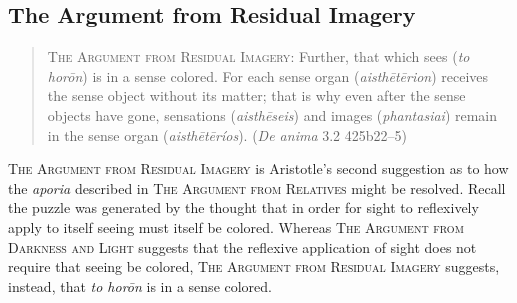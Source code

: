 





\subsection{The Argument from Residual Imagery} %
\label{sub:the_argument_from_residual_imagery}

\begin{quote}
	\textsc{The Argument from Residual Imagery}: Further, that which sees (\emph{to horōn}) is in a sense colored. For each sense organ (\emph{aisthētērion}) receives the sense object without its matter; that is why even after the sense objects have gone, sensations (\emph{aisthēseis}) and images (\emph{phantasiai}) remain in the sense organ (\emph{aisthētēríos}). (\emph{De anima} 3.2 425b22–5)
\end{quote}

\textsc{The Argument from Residual Imagery} is Aristotle's second suggestion as to how the \emph{aporia} described in \textsc{The Argument from Relatives} might be resolved. Recall the puzzle was generated by the thought that in order for sight to reflexively apply to itself seeing must itself be colored. Whereas \textsc{The Argument from Darkness and Light} suggests that the reflexive application of sight does not require that seeing be colored, \textsc{The Argument from Residual Imagery} suggests, instead, that \emph{to horōn} is in a sense colored.

